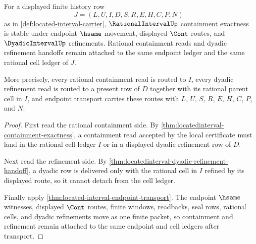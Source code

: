 \begin{theorem}
\label{thm:locatedinterval-containment-transport-scope}
For a displayed finite history row
$$
J=(L,U,I,D,S,R,E,H,C,P,N)
$$
as in \autoref{def:located-interval-carrier}, $\RationalIntervalUp$ containment exactness is stable under endpoint $\hsame$ movement, displayed $\Cont$ routes, and $\DyadicIntervalUp$ refinements. Rational containment reads and dyadic refinement handoffs remain attached to the same endpoint ledger and the same rational cell ledger of $J$.

More precisely, every rational containment read is routed to $I$, every dyadic refinement read is routed to a present row of $D$ together with its rational parent cell in $I$, and endpoint transport carries these routes with $L$, $U$, $S$, $R$, $E$, $H$, $C$, $P$, and $N$.
\end{theorem}
\begin{proof}
First read the rational containment side. By \autoref{thm:locatedinterval-containment-exactness}, a containment read accepted by the local certificate must land in the rational cell ledger $I$ or in a displayed dyadic refinement row of $D$.

Next read the refinement side. By \autoref{thm:locatedinterval-dyadic-refinement-handoff}, a dyadic row is delivered only with the rational cell in $I$ refined by its displayed route, so it cannot detach from the cell ledger.

Finally apply \autoref{thm:located-interval-endpoint-transport}. The endpoint $\hsame$ witnesses, displayed $\Cont$ routes, finite windows, readbacks, seal rows, rational cells, and dyadic refinements move as one finite packet, so containment and refinement remain attached to the same endpoint and cell ledgers after transport.
\end{proof}

